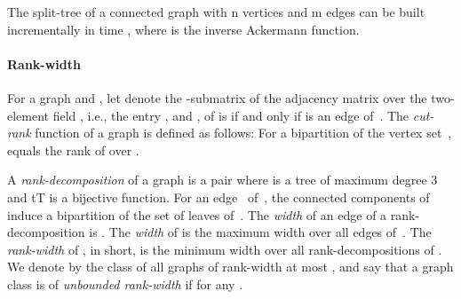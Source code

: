 \documentclass{llncs}
\begin{document}
{\begin{theorem}\label{thm:computingGLT}
The split-tree  of a connected graph  with n vertices and
m edges can be built incrementally in time , where  is the inverse Ackermann function.
\end{theorem}
}

 \lv{\prelimsplitsb}

\paragraph{Rank-width}


For a graph  and , let  denote the
-submatrix of the adjacency matrix over the two-element
field , i.e., the entry ,  and , of  is  if and only if  is an edge
of~.  The {\em cut-rank} function  of a graph  is
defined as follows: For a bipartition  of the vertex
set~,  equals the rank of 
over . 

A \emph{rank-decomposition} of a graph  is a pair 
where  is a tree of maximum degree 3 and tT is a bijective function. For an edge~ of~, the connected components of  induce a
bipartition  of the set of leaves of~.  The \emph{width} of
an edge  of a rank-decomposition  is .
The \emph{width} of  is the maximum width over all edges of~.  The \emph{rank-width} of ,  in short, is the minimum width over all
rank-decompositions of . We denote by  the class of all graphs of rank-width at most , and say that a graph class  is of \emph{unbounded rank-width} if  for any .



\newenvironment{psmallmatrix}
  {\left(\begin{smallmatrix}}
  {\end{smallmatrix}\right)}
\end{document}
